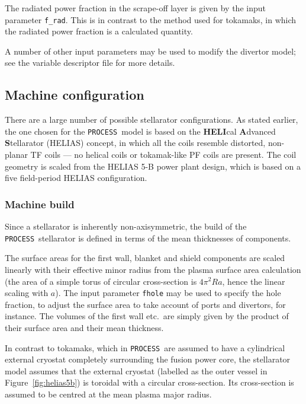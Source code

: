 \documentclass[11pt,a4paper]{report}
\newcommand{\process}{\mbox{\texttt{PROCESS}}}
\begin{document}
The radiated power fraction in the scrape-off layer is given by the input
parameter \texttt{f\_rad}. This is in contrast to the method used for
tokamaks, in which the radiated power fraction is a calculated quantity.

A number of other input parameters may be used to modify the divertor model;
see the variable descriptor file for more details.

\subsection{Machine configuration}

There are a large number of possible stellarator configurations. As stated
earlier, the one chosen for the \process\ model is based on the
\textbf{HELI}cal \textbf{A}dvanced \textbf{S}tellarator (HELIAS) concept, in
which all the coils resemble distorted, non-planar TF coils --- no helical
coils or tokamak-like PF coils are present.  The coil geometry is scaled from
the HELIAS 5-B power plant design, which is based on a five field-period
HELIAS configuration.

\subsubsection{Machine build}
\label{sec:stbuild}

Since a stellarator is inherently non-axisymmetric, the build of the \process\
stellarator is defined in terms of the mean thicknesses of components.

The surface areas for the first wall, blanket and shield components are scaled
linearly with their effective minor radius from the plasma surface area
calculation (the area of a simple torus of circular cross-section is $4 \pi^2
R a$, hence the linear scaling with $a$). The input parameter \texttt{fhole}
may be used to specify the hole fraction, to adjust the surface area to
take account of ports and divertors, for instance. The volumes of the first
wall etc.\ are simply given by the product of their surface area and their
mean thickness.

In contrast to tokamaks, which in \process\ are assumed to have a cylindrical
external cryostat completely surrounding the fusion power core, the
stellarator model assumes that the external cryostat (labelled as the outer
vessel in Figure~\ref{fig:helias5b}) is toroidal with a circular
cross-section. Its cross-section is assumed to be centred at the mean plasma
major radius.
\end{document}
